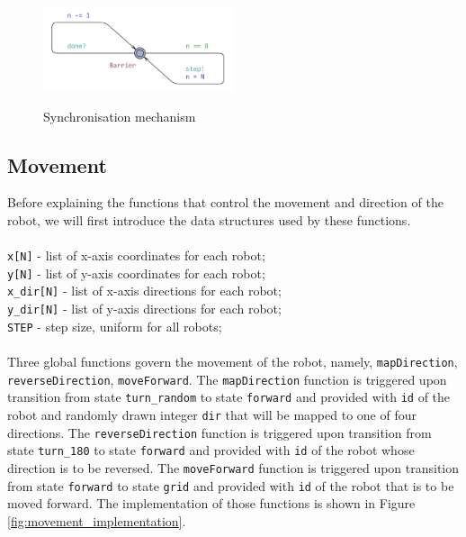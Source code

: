 \begin{figure}[H]
\caption{Synchronisation mechanism}
\centering
\includegraphics[width=0.5\textwidth]{images/implementation_synchronised_barrier.png}
\label{fig:implementation_synchronised_barrier}
\end{figure}

\subsection{Movement}
Before explaining the functions that control the movement and direction of the robot, we will first introduce the data structures used by these functions.
\\\\
\texttt{x[N]} - list of x-axis coordinates for each robot;\\
\texttt{y[N]} - list of y-axis coordinates for each robot;\\
\texttt{x\_dir[N]} - list of x-axis directions for each robot;\\
\texttt{y\_dir[N]} - list of y-axis directions for each robot;\\
\texttt{STEP} - step size, uniform for all robots;\\\\
\noindent
Three global functions govern the movement of the robot, namely, \texttt{mapDirection}, \texttt{reverseDirection}, \texttt{moveForward}. The \texttt{mapDirection} function is triggered upon transition from state \texttt{turn\_random} to state \texttt{forward} and provided with \texttt{id} of the robot and randomly drawn integer \texttt{dir} that will be mapped to one of four directions. The \texttt{reverseDirection} function is triggered upon transition from state \texttt{turn\_180} to state \texttt{forward} and provided with \texttt{id} of the robot whose direction is to be reversed. The \texttt{moveForward} function is triggered upon transition from state \texttt{forward} to state \texttt{grid} and provided with \texttt{id} of the robot that is to be moved forward. The implementation of those functions is shown in Figure \ref{fig:movement_implementation}.

